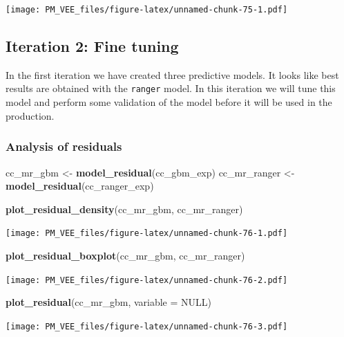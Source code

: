 \documentclass[12pt,]{krantz}
\newenvironment{Shaded}{\begin{snugshade}}{\end{snugshade}}
\newcommand{\DataTypeTok}[1]{\textcolor[rgb]{0.13,0.29,0.53}{#1}}
\newcommand{\KeywordTok}[1]{\textcolor[rgb]{0.13,0.29,0.53}{\textbf{#1}}}
\newcommand{\NormalTok}[1]{#1}
\newcommand{\OtherTok}[1]{\textcolor[rgb]{0.56,0.35,0.01}{#1}}
\newcommand{\StringTok}[1]{\textcolor[rgb]{0.31,0.60,0.02}{#1}}
\begin{document}
\texttt{[image: PM\_VEE\_files/figure-latex/unnamed-chunk-75-1.pdf]}

\hypertarget{iteration-2-fine-tuning}{%
\subsection{Iteration 2: Fine tuning}\label{iteration-2-fine-tuning}}

In the first iteration we have created three predictive models. It looks like best results are obtained with the \texttt{ranger} model. In this iteration we will tune this model and perform some validation of the model before it will be used in the production.

\hypertarget{analysis-of-residuals}{%
\subsubsection{Analysis of residuals}\label{analysis-of-residuals}}

\begin{Shaded}
\begin{Highlighting}[]
\NormalTok{cc_mr_gbm <-}\StringTok{ }\KeywordTok{model_residual}\NormalTok{(cc_gbm_exp)}
\NormalTok{cc_mr_ranger <-}\StringTok{ }\KeywordTok{model_residual}\NormalTok{(cc_ranger_exp)}

\KeywordTok{plot_residual_density}\NormalTok{(cc_mr_gbm, cc_mr_ranger)}
\end{Highlighting}
\end{Shaded}

\texttt{[image: PM\_VEE\_files/figure-latex/unnamed-chunk-76-1.pdf]}

\begin{Shaded}
\begin{Highlighting}[]
\KeywordTok{plot_residual_boxplot}\NormalTok{(cc_mr_gbm, cc_mr_ranger)}
\end{Highlighting}
\end{Shaded}

\texttt{[image: PM\_VEE\_files/figure-latex/unnamed-chunk-76-2.pdf]}

\begin{Shaded}
\begin{Highlighting}[]
\KeywordTok{plot_residual}\NormalTok{(cc_mr_gbm, }\DataTypeTok{variable =} \OtherTok{NULL}\NormalTok{)}
\end{Highlighting}
\end{Shaded}

\texttt{[image: PM\_VEE\_files/figure-latex/unnamed-chunk-76-3.pdf]}
\end{document}
